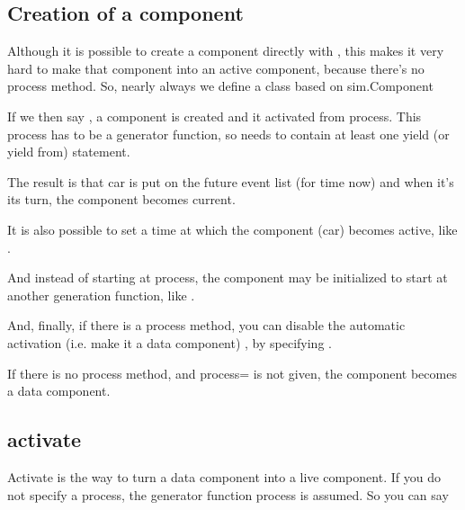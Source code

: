 \documentclass[letterpaper,10pt,english]{sphinxmanual}
\begin{document}
\subsection{Creation of a component}
\label{\detokenize{Component:creation-of-a-component}}
Although it is possible to create a component directly with , this
makes it very hard to make that component into an active component,
because there’s no process method. So, nearly always we define a class based on
sim.Component

%
\begin{sphinxVerbatim}[commandchars=\\\{\}]
 
     
\end{sphinxVerbatim}

If we then say , a component is created and it activated from process. This
process has to be a generator function, so needs to contain at least one yield (or yield from) statement.

The result is that car is put on the future event list (for time now) and when it’s its
turn, the component becomes current.

It is also possible to set a time at which the component (car) becomes active, like .

And instead of starting at process, the component may be initialized to start at another generation function,
like .

And, finally, if there is a process method, you can disable the automatic activation (i.e.
make it a data component) , by specifying .

If there is no process method, and process= is not given, the component becomes a data component.


\subsection{activate}
\label{\detokenize{Component:activate}}
Activate is the way to turn a data component into a live component. If you do not specify a process,
the generator function process is assumed. So you can say
\end{document}
